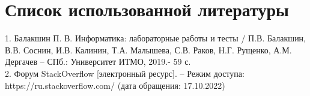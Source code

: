 \documentclass[12pt]{article}
\begin{document}
\section{Список использованной литературы}

1. Балакшин П. В. Информатика: лабораторные работы и тесты / П.В. Балакшин, В.В. Соснин, И.В. Калинин, Т.А. Малышева, С.В. Раков, Н.Г. Рущенко, А.М. Дергачев – СПб.: Университет ИТМО, 2019.- 59 с.\\
2. Форум StackOverflow [электронный ресурс]. – Режим доступа: https://ru.stackoverflow.com/ (дата обращения: 17.10.2022)
\end{document}

